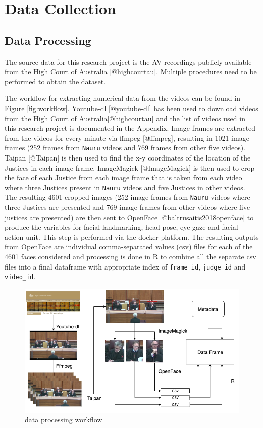 \documentclass{monashthesis}
\begin{document}
\hypertarget{data-collection}{%
\chapter{Data Collection}\label{data-collection}}

\hypertarget{data-processing}{%
\section{Data Processing}\label{data-processing}}

The source data for this research project is the AV recordings publicly available from the High Court of Australia {[}@highcourtau{]}. Multiple procedures need to be performed to obtain the dataset.

The workflow for extracting numerical data from the videos can be found in Figure \ref{fig:workflow}. Youtube-dl {[}@youtube-dl{]} has been used to download videos from the High Court of Australia{[}@highcourtau{]} and the list of videos used in this research project is documented in the Appendix. Image frames are extracted from the videos for every minute via ffmpeg {[}@ffmpeg{]}, resulting in 1021 image frames (252 frames from \texttt{Nauru} videos and 769 frames from other five videos). Taipan {[}@Taipan{]} is then used to find the x-y coordinates of the location of the Justices in each image frame. ImageMagick {[}@ImageMagick{]} is then used to crop the face of each Justice from each image frame that is taken from each video where three Justices present in \texttt{Nauru} videos and five Justices in other videos. The resulting 4601 cropped images (252 image frames from \texttt{Nauru} videos where three Justices are presented and 769 image frames from other videos where five justices are presented) are then sent to OpenFace {[}@baltrusaitis2018openface{]} to produce the variables for facial landmarking, head pose, eye gaze and facial action unit. This step is performed via the docker platform. The resulting outputs from OpenFace are individual comma-separated values (csv) files for each of the 4601 faces considered and processing is done in R to combine all the separate csv files into a final dataframe with appropriate index of \texttt{frame\_id}, \texttt{judge\_id} and \texttt{video\_id}.

\begin{figure}
\includegraphics[width=1\linewidth]{figures/workflow} \caption{data processing workflow \label{fig:workflow}}\label{fig:unnamed-chunk-1}
\end{figure}
\end{document}

